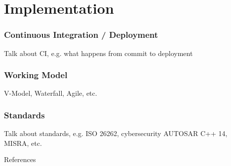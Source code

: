 \documentclass{beamer}
\begin{document}
\section{Implementation}

\begin{frame}
\frametitle{Continuous Integration / Deployment}
Talk about CI, e.g. what happens from commit to deployment
\end{frame}

\begin{frame}
\frametitle{Working Model}
V-Model, Waterfall, Agile, etc.
\end{frame}

\begin{frame}
\frametitle{Standards}
Talk about standards, e.g. ISO 26262, cybersecurity AUTOSAR C++ 14, MISRA, etc.
\end{frame}

\begin{frame}[allowframebreaks]{References}
\printbibliography
\end{frame}
\end{document}
